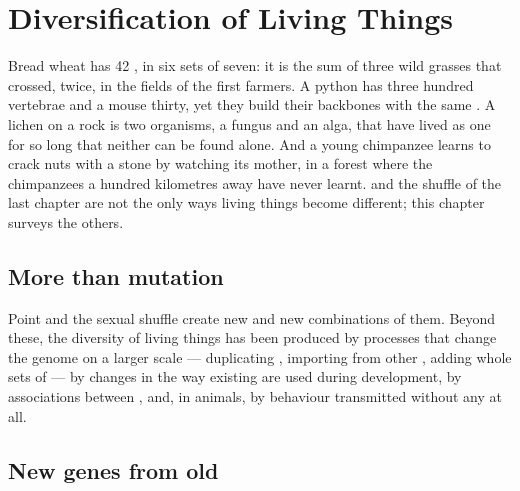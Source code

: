 \chapter{Diversification of Living Things}\label{ch:g12:diversification-of-life}

Bread wheat has 42 , in six sets of seven: it is the sum of
three wild grasses that crossed, twice, in the fields of the first
farmers. A python has three hundred vertebrae and a mouse thirty, yet
they build their backbones with the same . A lichen on a rock is
two organisms, a fungus and an alga, that have lived as one for so long
that neither can be found alone. And a young chimpanzee learns to crack
nuts with a stone by watching its mother, in a forest where the
chimpanzees a hundred kilometres away have never learnt.  and
the shuffle of the last chapter are not the only ways living things
become different; this chapter surveys the others.

\section{More than mutation}

\begin{proposition}\label{prop:g12:diversification-of-life:sources}
Point  and the sexual shuffle create new  and new
combinations of them. Beyond these, the diversity of living things has
been produced by processes that change the genome on a larger scale
--- duplicating , importing  from other , adding whole
sets of  --- by changes in the way existing  are used
during development, by associations between , and, in animals,
by behaviour transmitted without any  at all.
\end{proposition}
\admitted

\section{New genes from old}

